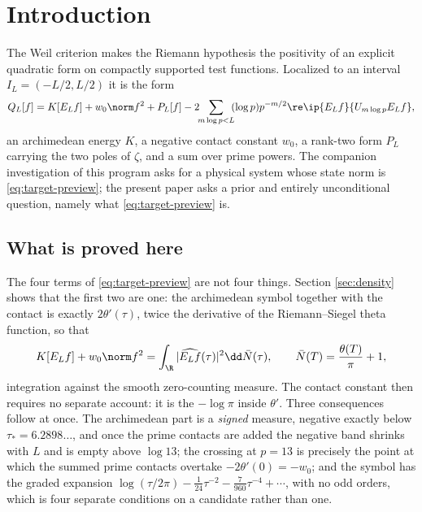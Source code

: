 \section{Introduction}\label{sec:intro}
The Weil criterion makes the Riemann hypothesis the positivity of an explicit
quadratic form on compactly supported test functions. Localized to an interval
$I_L=(-L/2,L/2)$ it is the form
\begin{equation}\label{eq:target-preview}
 Q_L[f]=K[E_Lf]+w_0\norm f^2+P_L[f]
 -2\!\!\sum_{m\log p<L}\!\!(\log p)p^{-m/2}\re\ip{E_Lf}{U_{m\log p}E_Lf},
\end{equation}
an archimedean energy $K$, a negative contact constant $w_0$, a rank-two form
$P_L$ carrying the two poles of $\zeta$, and a sum over prime powers. The
companion investigation of this program asks for a physical system whose state
norm is \eqref{eq:target-preview}; the present paper asks a prior and entirely
unconditional question, namely what \eqref{eq:target-preview} is.

\subsection{What is proved here}
The four terms of \eqref{eq:target-preview} are not four things. Section
\ref{sec:density} shows that the first two are one: the archimedean symbol
together with the contact is exactly $2\theta'(\tau)$, twice the derivative of
the Riemann--Siegel theta function, so that
\begin{equation}\label{eq:density-preview}
 K[E_Lf]+w_0\norm f^2=\int_\R|\widehat{E_Lf}(\tau)|^2\dd\bar N(\tau),
 \qquad \bar N(T)=\frac{\theta(T)}\pi+1,
\end{equation}
integration against the smooth zero-counting measure. The contact constant then
requires no separate account: it is the $-\log\pi$ inside $\theta'$. Three
consequences follow at once. The archimedean part is a \emph{signed} measure,
negative exactly below $\tau_*=6.2898\ldots$, and once the prime contacts are
added the negative band shrinks with $L$ and is empty above $\log13$; the
crossing at $p=13$ is precisely the point at which the summed prime contacts
overtake $-2\theta'(0)=-w_0$; and the symbol has the graded expansion
$\log(\tau/2\pi)-\tfrac1{24}\tau^{-2}-\tfrac7{960}\tau^{-4}+\cdots$, with no odd
orders, which is four separate conditions on a candidate rather than one.

